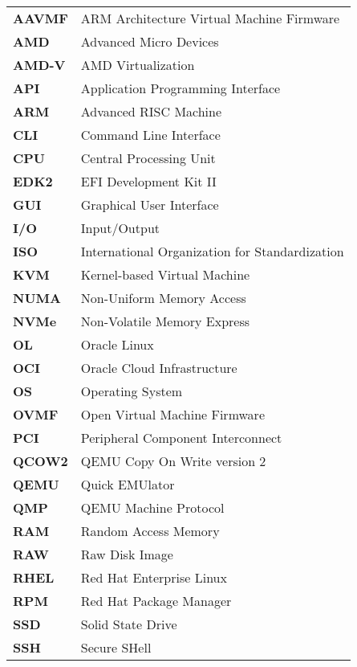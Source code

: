 

\begin{longtable}{l l}
    \textbf{AAVMF} & ARM Architecture Virtual Machine Firmware \\
    \textbf{AMD} & Advanced Micro Devices \\
    \textbf{AMD-V} & AMD Virtualization \\
    \textbf{API} & Application Programming Interface \\
    \textbf{ARM} & Advanced RISC Machine \\
    \textbf{CLI} & Command Line Interface \\
    \textbf{CPU} & Central Processing Unit \\
    \textbf{EDK2} & EFI Development Kit II \\
    \textbf{GUI} & Graphical User Interface \\
    \textbf{I/O} & Input/Output \\
    \textbf{ISO} & International Organization for Standardization \\
    \textbf{KVM} & Kernel-based Virtual Machine \\
    \textbf{NUMA} & Non-Uniform Memory Access \\
    \textbf{NVMe} & Non-Volatile Memory Express \\
    \textbf{OL} & Oracle Linux \\
    \textbf{OCI} & Oracle Cloud Infrastructure \\
    \textbf{OS} & Operating System \\
    \textbf{OVMF} & Open Virtual Machine Firmware \\
    \textbf{PCI} & Peripheral Component Interconnect \\
    \textbf{QCOW2} & QEMU Copy On Write version 2 \\
    \textbf{QEMU} & Quick EMUlator \\
    \textbf{QMP} & QEMU Machine Protocol \\
    \textbf{RAM} & Random Access Memory \\
    \textbf{RAW} & Raw Disk Image \\
    \textbf{RHEL} & Red Hat Enterprise Linux \\
    \textbf{RPM} & Red Hat Package Manager \\
    \textbf{SSD} & Solid State Drive \\
    \textbf{SSH} & Secure SHell \\

\end{longtable}
